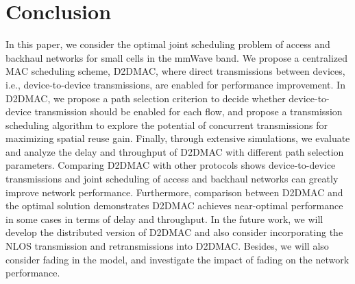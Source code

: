 \documentclass[journal]{IEEEtran}
\begin{document}
\section{Conclusion}\label{S7} 
In this paper, we consider the optimal joint scheduling problem of access and backhaul networks for
small cells in the mmWave band. We propose a centralized MAC scheduling scheme, D2DMAC, where
direct transmissions between devices, i.e., device-to-device transmissions, are enabled for
performance improvement. In D2DMAC, we propose a path selection criterion to decide whether
device-to-device transmission should be enabled for each flow, and propose a transmission
scheduling algorithm to explore the potential of concurrent transmissions for maximizing spatial
reuse gain. Finally, through extensive simulations, we evaluate and analyze the delay and
throughput of D2DMAC with different path selection parameters. Comparing D2DMAC with other
protocols shows device-to-device transmissions and joint scheduling of access and backhaul networks can greatly improve network performance.
Furthermore, comparison between D2DMAC and the optimal solution demonstrates D2DMAC achieves
near-optimal performance in some cases in terms of delay and throughput. In the future work, we will develop the distributed version of D2DMAC and also consider incorporating the NLOS transmission and retransmissions into D2DMAC. Besides, we will also consider fading in the model, and investigate the impact of fading on the network performance.
\end{document}

